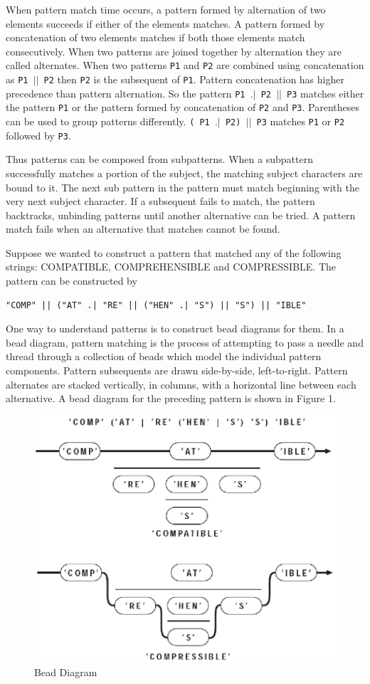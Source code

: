 \documentclass[letterpaper,12pt]{article}
\begin{document}
When pattern match time occurs, a pattern formed
by alternation of two elements succeeds if either of the elements
matches. A pattern formed by concatenation of two elements matches if
both those elements match consecutively. When two patterns are joined
together by alternation they are called alternates. When two patterns
{\tt P1} and {\tt P2} are combined using concatenation as {\tt P1 $||$ P2}
then {\tt P2} is the subsequent of {\tt P1}. Pattern concatenation has
higher precedence than pattern alternation. So the pattern
{\tt P1 $.|$ P2 $||$ P3} matches either the pattern {\tt P1} or the
pattern formed by concatenation of {\tt P2} and
{\tt P3}. Parentheses can be used to group patterns differently.
{\tt ( P1 $.|$ P2) $||$ P3} matches {\tt P1} or {\tt P2} followed by
{\tt P3}.

Thus patterns can be composed from subpatterns. When a subpattern
successfully matches a portion of the subject, the matching subject
characters are bound to it. The next sub pattern in the pattern must
match beginning with the very next subject character. If a subsequent
fails to match, the pattern backtracks, unbinding patterns until
another alternative can be tried. A pattern match fails when an
alternative that matches cannot be found.

Suppose we wanted to construct a pattern that matched any of the
following strings: COMPATIBLE, COMPREHENSIBLE and
COMPRESSIBLE. The pattern can be constructed by

\begin{verbatim}
"COMP" || ("AT" .| "RE" || ("HEN" .| "S") || "S") || "IBLE"
\end{verbatim}

One way to understand patterns is to construct bead diagrams for
them. In a bead diagram, pattern matching is the process of attempting
to pass a needle and thread through a collection of beads which model
the individual pattern components. Pattern subsequents are drawn
side-by-side, left-to-right. Pattern alternates are stacked
vertically, in columns, with a horizontal line between each
alternative.  A bead diagram for the preceding pattern is shown
in Figure 1.
\begin{figure}[h]
\centering
\includegraphics[width=4.9in]{beaddia.png}
\caption{Bead Diagram}
\end{figure}
\end{document}
